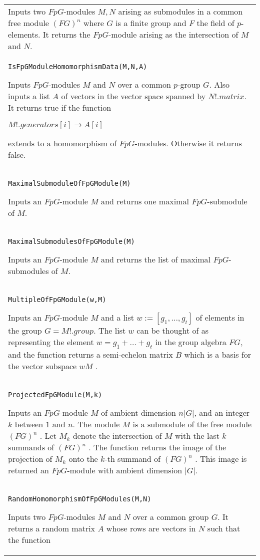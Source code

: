 \documentclass[a4paper,11pt]{report}
\begin{document}
{\begin{center}
\begin{tabular}{|l|}
 Inputs two $FpG$-modules $M, N$ arising as submodules in a common free module $(FG)^n$ where $G$ is a finite group and $F$ the field of $p$-elements. It returns the $FpG$-module arising as the intersection of $M$ and $N$. \\
 \index{IsFpGModuleHomomorphismData} \texttt{IsFpGModuleHomomorphismData(M,N,A) } 

 Inputs $FpG$-modules $M$ and $N$ over a common $p$-group $G$. Also inputs a list $A$ of vectors in the vector space spanned by $N!.matrix$. It returns true if the function 

 $ M!.generators[i] \longrightarrow A[i]$ 

 extends to a homomorphism of $FpG$-modules. Otherwise it returns false. \\
 \index{MaximalSubmoduleOfFpGModule} \texttt{MaximalSubmoduleOfFpGModule(M) } 

 Inputs an $FpG$-module $M$ and returns one maximal $FpG$-submodule of $M$. \\
 \index{MaximalSubmodulesOfFpGModule} \texttt{MaximalSubmodulesOfFpGModule(M) } 

 Inputs an $FpG$-module $M$ and returns the list of maximal $FpG$-submodules of $M$. \\
 \index{MultipleOfFpGModule} \texttt{MultipleOfFpGModule(w,M) } 

 Inputs an $FpG$-module $M$ and a list $w:=[g_1 , ..., g_t]$ of elements in the group $G=M!.group$. The list $w$ can be thought of as representing the element $w=g_1 + \ldots + g_t$ in the group algebra $FG$, and the function returns a semi-echelon matrix $B$ which is a basis for the vector subspace $wM$ . \\
 \index{ProjectedFpGModule} \texttt{ProjectedFpGModule(M,k) } 

 Inputs an $FpG$-module $M$ of ambient dimension $n|G|$, and an integer $k$ between $1$ and $n$. The module $M$ is a submodule of the free module $(FG)^n$ . Let $M_k$ denote the intersection of $M$ with the last $k$ summands of $(FG)^n$ . The function returns the image of the projection of $M_k$ onto the $k$-th summand of $(FG)^n$ . This image is returned an $FpG$-module with ambient dimension $|G|$. \\
 \index{RandomHomomorphismOfFpGModules} \texttt{RandomHomomorphismOfFpGModules(M,N) } 

 Inputs two $FpG$-modules $M$ and $N$ over a common group $G$. It returns a random matrix $A$ whose rows are vectors in $N$ such that the function 


\end{tabular}
\end{center}}
\end{document}
